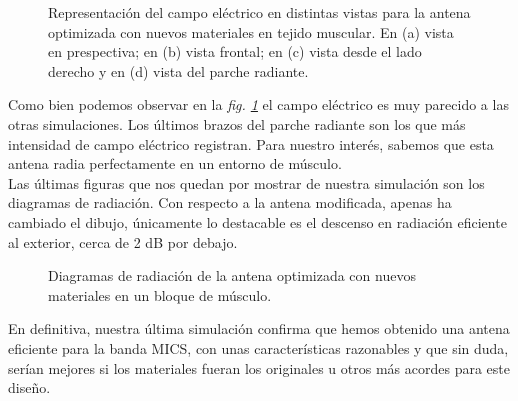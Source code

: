 \begin{figure}[!htb]
    \caption{Representación del campo eléctrico en distintas vistas para la antena optimizada con nuevos materiales en tejido muscular. En (a) vista en prespectiva; en (b) vista frontal; en (c) vista desde el lado derecho y en (d) vista del parche radiante.}
    \label{fig:fig5.39}
\end{figure}

Como bien podemos observar en la \textit{fig. \ref{fig:fig5.39}} el campo eléctrico es muy parecido a las otras simulaciones. Los últimos brazos del parche radiante son los que más intensidad de campo eléctrico registran. Para nuestro interés, sabemos que esta antena radia perfectamente en un entorno de músculo.\\

Las últimas figuras que nos quedan por mostrar de nuestra simulación son los diagramas de radiación. Con respecto a la antena modificada, apenas ha cambiado el dibujo, únicamente lo destacable es el descenso en radiación eficiente al exterior, cerca de 2 dB por debajo.

\begin{figure}[!htb]
    \centering
    \caption{Diagramas de radiación de la antena optimizada con nuevos materiales en un bloque de músculo.}
    \label{fig:fig5.40}
\end{figure}

En definitiva, nuestra última simulación confirma que hemos obtenido una antena eficiente para la banda MICS, con unas características razonables y que sin duda, serían mejores si los materiales fueran los originales u otros más acordes para este diseño.
